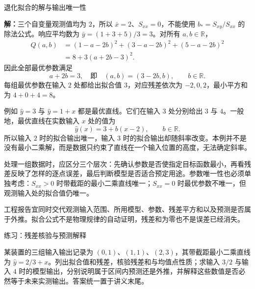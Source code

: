 \documentclass[aspectratio=169,10pt,fontset=fandol]{ctexbeamer}
\begin{document}
\begin{frame}[t,fragile]{退化拟合的解与输出唯一性}
\normalsize
{\normalsize
\par\noindent\textbf{解：}三个自变量观测值均为 $2$，所以 $\bar{x}=2$、$S_{xx}=0$，不能使用 $b_*=S_{xy}/S_{xx}$ 的除法公式。响应平均数为 $\bar{y}=(1+3+5)/3=3$。对所有 $a,b\in\mathbb{R}$，
\[
\begin{aligned}
Q(a,b)&=(1-a-2b)^2+(3-a-2b)^2+(5-a-2b)^2\\
&=8+3(a+2b-3)^2.
\end{aligned}
\]
因此全部最优参数满足
\[
a+2b=3,
\quad\text{即}\quad (a,b)=(3-2b,b),\qquad b\in\mathbb{R}.
\]
每组最优参数在输入 $2$ 处都给出拟合值 $3$，对应残差依次为 $-2,0,2$，最小平方和为 $4+0+4=8$。


}
{\normalsize
例如 $\hat{y}=3$ 与 $\hat{y}=1+x$ 都是最优直线。它们在输入 $3$ 处分别给出 $3$ 与 $4$。一般地，最优直线在实数输入 $x$ 处的值为
\[
\hat{y}(x)=3+b(x-2),\qquad b\in\mathbb{R}.
\]
所以输入 $2$ 时的拟合输出唯一，输入 $3$ 时的拟合输出却随斜率改变。本例并不是没有最小二乘解，而是数据只约束了直线在一个输入位置的高度，无法确定斜率。\par

}
{\normalsize
处理一组数据时，应区分三个层次：先确认参数是否使指定目标函数最小，再看残差反映了怎样的逐点误差，最后判断模型是否适合预定用途。参数唯一性也必须单独考虑：$S_{xx}>0$ 时带截距的最小二乘直线唯一；$S_{xx}=0$ 时最优参数不唯一，但观测输入处的拟合值仍唯一。


}
{\normalsize
工程报告宜同时交代观测输入范围、所用模型、参数、残差平方和以及预测是否属于外推。拟合公式不是物理规律的自动证明，残差和为零也不是误差已经消失。\par

}
\end{frame}
\begin{frame}[t,fragile]{练习：残差核验与预测解释}
\normalsize
{\normalsize
\begin{exercise}
\label{mathagent:exercise:792316d6ae426af3441a87022eb342411ffcb273e3da7957f4be83fb59518d0a}
某装置的三组输入输出记录为 $(0,1)$、$(1,1)$、$(2,3)$，其带截距最小二乘直线为 $\hat{y}=2/3+x$。列出拟合值和残差，核验残差和与均值点性质；求输入 $3/2$ 与输入 $4$ 时的模型输出，分别说明属于区间内预测还是外推，并解释这些数值是否必然等于未来实测输出。答案统一置于讲义末尾。
\end{exercise}
}
\end{frame}
\end{document}
